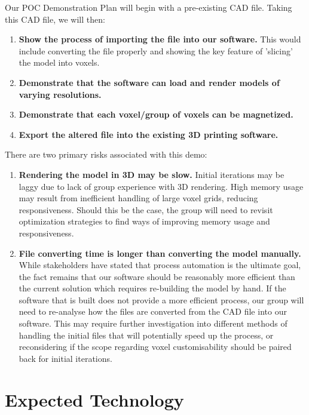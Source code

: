 \documentclass{article}
\begin{document}
Our POC Demonstration Plan will begin with a pre-existing CAD file. Taking this 
CAD file, we will then:

\begin{enumerate}
  \item \textbf{Show the process of importing the file into our software.} This would include converting the file properly and showing the key feature of 'slicing' the model into voxels.
  \item \textbf{Demonstrate that the software can load and render models of varying resolutions.}
  \item \textbf{Demonstrate that each voxel/group of voxels can be magnetized.}
  \item \textbf{Export the altered file into the existing 3D printing software.}
\end{enumerate}

There are two primary risks associated with this demo:

\begin{enumerate}
  \item \textbf{Rendering the model in 3D may be slow.} Initial iterations may be laggy due to lack of group experience with 3D rendering. High memory usage may result from inefficient handling of large voxel grids, reducing responsiveness. Should this be the case, the group will need to revisit optimization strategies to find ways of improving memory usage and responsiveness.
  \item \textbf{File converting time is longer than converting the model manually.} While stakeholders have stated that process automation is the ultimate goal, the fact remains that our software should be reasonably more efficient than the current solution which requires re-building the model by hand. If the software that is built does not provide a more efficient process, our group will need to re-analyse how the files are converted from the CAD file into our software. This may require further investigation into different methods of handling the initial files that will potentially speed up the process, or reconsidering if the scope regarding voxel customisability should be paired back for initial iterations.
\end{enumerate}

\section{Expected Technology}

\iffalse
{}
\end{document}
